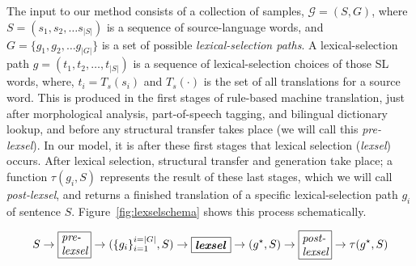 \documentclass[11pt]{article}
\begin{document}
The input to our method consists of a collection of samples,
$\mathcal{G} = (S, G)$, where $S = (s_1, s_2, \ldots s_{|S|})$ is a
sequence of source-language words, and $G = \{g_1, g_2, \ldots
g_{|G|}\}$ is a set of possible \emph{lexical-selection paths}. A
lexical-selection path $g = (t_1, t_2, \ldots, t_{|S|})$ is a sequence
of lexical-selection choices of those SL words, where, \(t_i=T_s(s_i)\)
and \(T_s(\cdot)\)  is the set of all translations for a source
word. This is produced in the first stages of rule-based machine
translation, just after morphological analysis, part-of-speech
tagging, and bilingual dictionary lookup, and before any structural
transfer takes place (we will call this \emph{pre-lexsel}). In our
model, it is after these first stages that lexical selection
(\emph{lexsel}) occurs. After lexical selection, structural transfer
and generation take place; a function $\tau(g_i,S)$ represents the
result of these last stages, which we will call \emph{post-lexsel},
and returns a finished translation of a specific lexical-selection
path $g_i$ of sentence $S$. Figure~\ref{fig:lexselschema} shows
 this process schematically.
\begin{figure*}
\begin{displaymath}
  \label{eq:steps}
  S \to \mbox{\framebox{\parbox{0.8cm}{\textit{pre- lexsel}}}} \to (\{g_i\}_{i=1}^{i=|G|},S) \to \mbox{\framebox{\parbox{1.0cm}{\textit{\textbf{lexsel}}}}} \to (g^\star,S) \to \mbox{\framebox{\parbox{0.8cm}{\textit{post- lexsel}}}} \to \tau(g^\star,S)
\end{displaymath}
 \caption{A schema of the training process}
 \label{fig:lexselschema}
\end{figure*}

\end{document}
